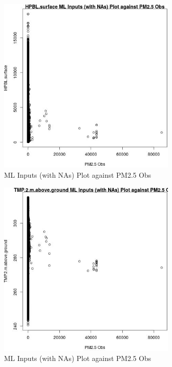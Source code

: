 \begin{figure} 
\centering  
\includegraphics[width=0.77\textwidth]{Code_Outputs/Report_ML_input_PM25_Step4_part_f_de_duplicated_aveswNAs_HPBLsurfacevPM25_Obs.jpg} 
\caption{\label{fig:Report_ML_input_PM25_Step4_part_f_de_duplicated_aveswNAsHPBLsurfacevPM25_Obs}ML Inputs (with NAs) Plot against PM2.5 Obs} 
\end{figure} 
 

\begin{figure} 
\centering  
\includegraphics[width=0.77\textwidth]{Code_Outputs/Report_ML_input_PM25_Step4_part_f_de_duplicated_aveswNAs_TMP2mabovegroundvPM25_Obs.jpg} 
\caption{\label{fig:Report_ML_input_PM25_Step4_part_f_de_duplicated_aveswNAsTMP2mabovegroundvPM25_Obs}ML Inputs (with NAs) Plot against PM2.5 Obs} 
\end{figure} 
 

